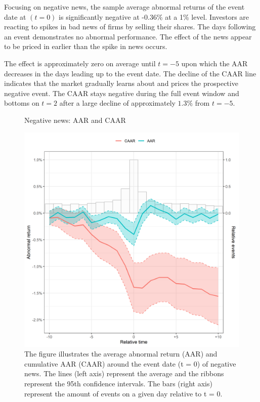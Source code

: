 Focusing on negative news, the sample average abnormal returns of the event date at $(t=0)$ is significantly negative at -0.36\% at a 1\% level. Investors are reacting to spikes in bad news of firms by selling their shares. The days following an event demonstrates no abnormal performance. The effect of the news appear to be priced in earlier than the spike in news occurs. 

The effect is approximately zero on average until $t = -5$ upon which the AAR decreases in the days leading up to the event date. The decline of the CAAR line indicates that the market gradually learns about and prices the prospective negative event.   
The CAAR stays negative during the full event window and bottoms on $t=2$ after a large decline of approximately $1.3\%$ from $t=-5$. 

\begin{figure} [H]
    \centering
    \caption{Negative news: AAR and CAAR}
    \includegraphics[scale=0.6]{Projekt/1.Figures analysis/ST_negative_all_CI.png}
     \caption*{\footnotesize The figure illustrates the average abnormal return (AAR) and cumulative AAR (CAAR) around the event date (t = 0) of negative news. The lines (left axis) represent the average and the ribbons represent the 95th confidence intervals. The bars (right axis) represent the amount of events on a given day relative to t = 0. }
    \label{fig:ST_neg_news}
\end{figure} 

